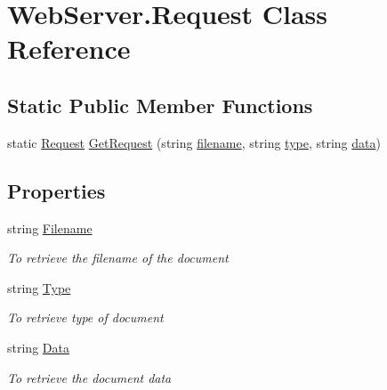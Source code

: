 \hypertarget{class_web_server_1_1_request}{}\section{Web\+Server.\+Request Class Reference}
\label{class_web_server_1_1_request}


 


\subsection*{Static Public Member Functions}
\begin{DoxyCompactItemize}
\item 
static \hyperlink{class_web_server_1_1_request}{Request} \hyperlink{class_web_server_1_1_request_aa79751fd888bac7c160ab4d06ba6d20a}{Get\+Request} (string \hyperlink{class_web_server_1_1_request_ae3ceee9488c19850b8b30787ea580b2d}{filename}, string \hyperlink{class_web_server_1_1_request_aed71124c91213d66448f2d4a4133dd22}{type}, string \hyperlink{class_web_server_1_1_request_aae3042ee0bc222bb9f2cd8ac00895848}{data})
\end{DoxyCompactItemize}
\subsection*{Properties}
\begin{DoxyCompactItemize}
\item 
string \hyperlink{class_web_server_1_1_request_a1797bd8f10a7b7131cf7b90df7a250af}{Filename}
\begin{DoxyCompactList}\small\item\em To retrieve the filename of the document \end{DoxyCompactList}\item 
string \hyperlink{class_web_server_1_1_request_a97f8cec3d26773cdc2d227817be59bfe}{Type}
\begin{DoxyCompactList}\small\item\em To retrieve type of document \end{DoxyCompactList}\item 
string \hyperlink{class_web_server_1_1_request_a42134399b1ac8892af03d7f0a52dcd2d}{Data}
\begin{DoxyCompactList}\small\item\em To retrieve the document data \end{DoxyCompactList}\end{DoxyCompactItemize}
